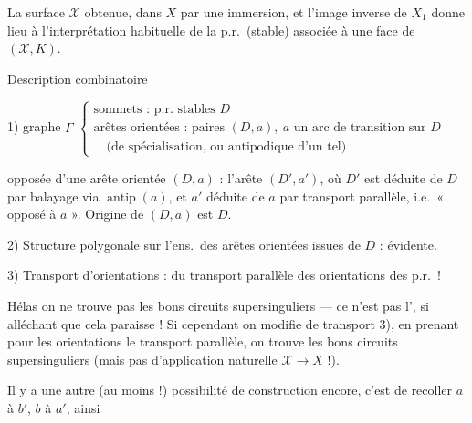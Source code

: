 \documentclass[11pt,a4paper]{article}
\begin{document}
La surface $\mathcal{X}$ obtenue,  dans $X$ par une immersion, et l'image inverse  de $X_1$ \struck{\ill{}} donne lieu à  l'interprétation habituelle de la p.r.\ (stable) associée à une face de $(\mathcal{X}, K)$.

Description combinatoire

1) graphe $\Gamma$ \quad $\left\lbrace \begin{array}{l} \text{sommets : p.r.\ stables } D \\ \text{arêtes orientées : paires } (D, a),\ a \text{ un arc de transition sur } D \\ \quad \text{(de spécialisation, ou antipodique d'un tel)} \end{array} \right.$

 opposée d'une arête orientée $(D, a)$ : l'arête $(D', a')$, où $D'$ est déduite de $D$ par balayage via \struck{\ill{}} $\operatorname{antip}(a)$, et $a'$  déduite de $a$ par transport parallèle, i.e.\ « opposé à $a$ ». Origine de $(D, a)$ est $D$.

2) Structure polygonale sur l'ens.\ des arêtes orientées issues de $D$ : évidente.

3) Transport d'orientations : \emph{} du transport parallèle des orientations des p.r.\ !

Hélas on ne trouve pas les bons circuits supersinguliers --- \struck{\ill{}} ce n'est pas l', si alléchant que cela paraisse ! Si cependant on modifie  de transport 3), en prenant pour les orientations le transport parallèle, on trouve les bons circuits supersinguliers (mais pas d'application naturelle $\mathcal{X} \to X$ !).

Il y a une autre (au moins !) possibilité de construction encore, c'est de recoller $a$ à $b'$, $b$ à $a'$, ainsi
\end{document}
